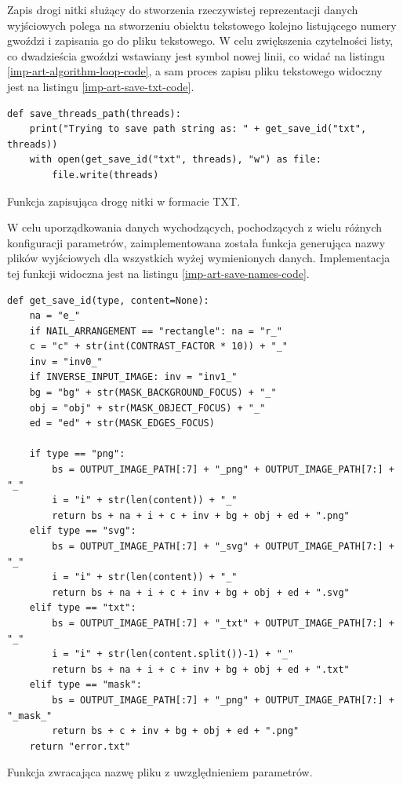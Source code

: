         Zapis drogi nitki służący do stworzenia rzeczywistej reprezentacji danych wyjściowych polega na stworzeniu obiektu tekstowego kolejno listującego numery gwoździ i zapisania go do pliku tekstowego. W celu zwiększenia czytelności listy, co dwadzieścia gwoździ wstawiany jest symbol nowej linii, co widać na listingu \ref{imp-art-algorithm-loop-code}, a sam proces zapisu pliku tekstowego widoczny jest na listingu \ref{imp-art-save-txt-code}.
        \begin{code}[H]
        \begin{verbatim}
def save_threads_path(threads):
    print("Trying to save path string as: " + get_save_id("txt", threads))
    with open(get_save_id("txt", threads), "w") as file:
        file.write(threads)
        \end{verbatim}
        \caption{Funkcja zapisująca drogę nitki w formacie TXT.}
        \label{imp-art-save-txt-code}
        \end{code}

        
        W celu uporządkowania danych wychodzących, pochodzących z wielu różnych konfiguracji parametrów, zaimplementowana została funkcja generująca nazwy plików wyjściowych dla wszystkich wyżej wymienionych danych. Implementacja tej funkcji widoczna jest na listingu \ref{imp-art-save-names-code}.
        \begin{code}[H]
        \begin{verbatim}
def get_save_id(type, content=None):
    na = "e_"
    if NAIL_ARRANGEMENT == "rectangle": na = "r_"
    c = "c" + str(int(CONTRAST_FACTOR * 10)) + "_"
    inv = "inv0_"
    if INVERSE_INPUT_IMAGE: inv = "inv1_"
    bg = "bg" + str(MASK_BACKGROUND_FOCUS) + "_"
    obj = "obj" + str(MASK_OBJECT_FOCUS) + "_"
    ed = "ed" + str(MASK_EDGES_FOCUS)

    if type == "png":
        bs = OUTPUT_IMAGE_PATH[:7] + "_png" + OUTPUT_IMAGE_PATH[7:] + "_"
        i = "i" + str(len(content)) + "_"
        return bs + na + i + c + inv + bg + obj + ed + ".png"
    elif type == "svg":
        bs = OUTPUT_IMAGE_PATH[:7] + "_svg" + OUTPUT_IMAGE_PATH[7:] + "_"
        i = "i" + str(len(content)) + "_"
        return bs + na + i + c + inv + bg + obj + ed + ".svg"
    elif type == "txt":
        bs = OUTPUT_IMAGE_PATH[:7] + "_txt" + OUTPUT_IMAGE_PATH[7:] + "_"
        i = "i" + str(len(content.split())-1) + "_"
        return bs + na + i + c + inv + bg + obj + ed + ".txt"
    elif type == "mask":
        bs = OUTPUT_IMAGE_PATH[:7] + "_png" + OUTPUT_IMAGE_PATH[7:] + "_mask_"
        return bs + c + inv + bg + obj + ed + ".png"
    return "error.txt"
        \end{verbatim}
        \caption{Funkcja zwracająca nazwę pliku z uwzględnieniem parametrów.}
        \label{imp-art-save-names-code}
        \end{code}


